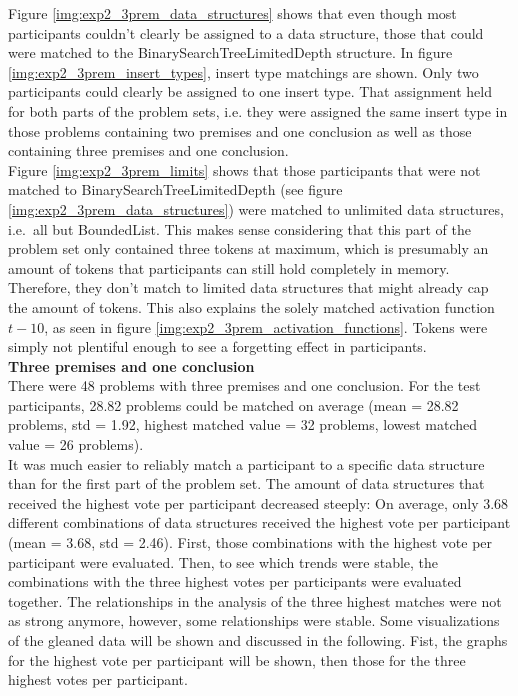 \documentclass[hidelinks]{scrartcl}
\begin{document}
Figure \ref{img:exp2_3prem_data_structures} shows that even though most participants couldn't clearly be assigned to a data structure, those that could were matched to the BinarySearchTreeLimitedDepth structure. In figure \ref{img:exp2_3prem_insert_types}, insert type matchings are shown. Only two participants could clearly be assigned to one insert type. That assignment held for both parts of the problem sets, i.e. they were assigned the same insert type in those problems containing two premises and one conclusion as well as those containing three premises and one conclusion. \\
Figure \ref{img:exp2_3prem_limits} shows that those participants that were not matched to BinarySearchTreeLimitedDepth (see figure \ref{img:exp2_3prem_data_structures}) were matched to unlimited data structures, i.e.\ all but BoundedList. This makes sense considering that this part of the problem set only contained three tokens at maximum, which is presumably an amount of tokens that participants can still hold completely in memory. Therefore, they don't match to limited data structures that might already cap the amount of tokens. This also explains the solely matched activation function $t-10$, as seen in figure \ref{img:exp2_3prem_activation_functions}. Tokens were simply not plentiful enough to see a forgetting effect in participants. \\

\textbf{Three premises and one conclusion} \\
There were 48 problems with three premises and one conclusion. For the test participants, 28.82 problems could be matched on average (mean = 28.82 problems, std = 1.92, highest matched value = 32 problems, lowest matched value = 26 problems). \\
It was much easier to reliably match a participant to a specific data structure than for the first part of the problem set. The amount of data structures that received the highest vote per participant decreased steeply: On average, only 3.68 different combinations of data structures received the highest vote per participant (mean = 3.68, std = 2.46). First, those combinations with the highest vote per participant were evaluated. Then, to see which trends were stable, the combinations with the three highest votes per participants were evaluated together. The relationships in the analysis of the three highest matches were not as strong anymore, however, some relationships were stable. Some visualizations of the gleaned data will be shown and discussed in the following. Fist, the graphs for the highest vote per participant will be shown, then those for the three highest votes per participant.
\end{document}

